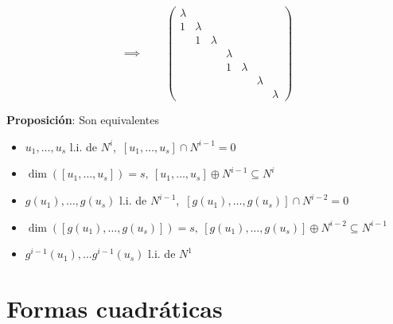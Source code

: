 \documentclass[leqno]{article}
\begin{document}
\begin{multicols}{2}

\columnbreak 
$$ 
\implies \qquad 
\begin{pmatrix}
\lambda & & & & & & \\
1& \lambda & & & & & \\
& 1&\lambda  & & & & \\
& & &\lambda  & & & \\
& & &1 &\lambda  & & \\
& & & & &\lambda  & \\
& & & & & &\lambda 
\end{pmatrix}
$$

\end{multicols}

\textbf{Proposición}: Son equivalentes
\begin{itemize}
    \item $u_1, \ldots , u_s$ l.i. de $N^i$,\  $[u_1, \ldots , u_s]\cap N^{i-1}=0$
    \item $\dim([u_1, \ldots, u_s]) = s, \ [u_1, \ldots , u_s]\oplus N^{i-1} \subseteq N^i$
    \item $g(u_1), \ldots , g(u_s)$ l.i. de $N^{i-1}$,\  $[g(u_1), \ldots , g(u_s)]\cap N^{i-2}=0$
    \item $\dim([g(u_1), \ldots, g(u_s)]) = s, \ [g(u_1), \ldots , g(u_s)]\oplus N^{i-2} \subseteq N^{i-1}$
    \item $g^{i-1}(u_1), \ldots g^{i-1}(u_s)$ l.i. de $N^1$
\end{itemize}

\section{Formas cuadráticas}
\end{document}
